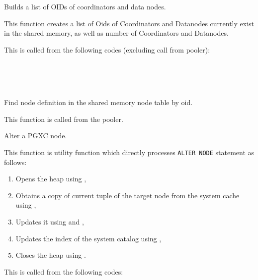   
    Builds a list of OIDs of coordinators and data nodes.
    
    This function creates a list of Oids of Coordinators and Datanodes currently exist in the shared memory,
	as well as number of Coordinators and Datanodes.
    
    This is called from the following codes (excluding call from pooler):
    
    \FuncRefHdr
		\\
		\\
		\\
		\hline
    \FuncRefTrailor
  
  
    Find node definition in the shared memory node table by oid.
    
    This function is called from the pooler.
  
  
    Alter a PGXC node.
    
    This function is utility function which directly processes \texttt{ALTER NODE} statement as follows:
    
	\begin{enumerate}
		\item Opens the heap using ,
	    \item Obtains a copy of current tuple of the target node from the system cache using ,
		\item Updates it using  and ,
		\item Updates the index of the system catalog using ,
		\item Closes the heap using .
	\end{enumerate}
    
    This is called from the following codes:
    
    \FuncRefHdr
		\\ \hline
    \FuncRefTrailor
  
